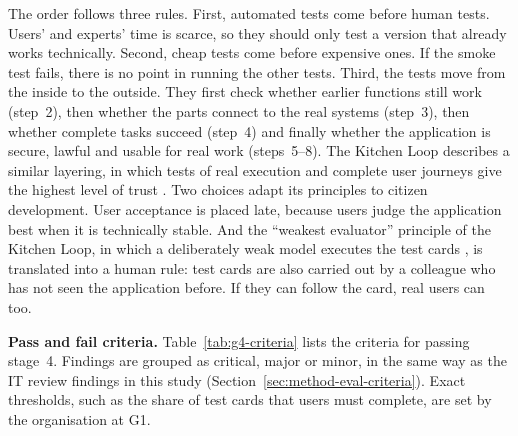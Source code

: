\documentclass[10pt,a4paper]{article}
\begin{document}
The order follows three rules. First, automated tests come before human tests.
Users' and experts' time is scarce, so they should only test a version that
already works technically. Second, cheap tests come before expensive ones. If
the smoke test fails, there is no point in running the other tests. Third, the
tests move from the inside to the outside. They first check whether earlier
functions still work (step~2), then whether the parts connect to the real
systems (step~3), then whether complete tasks succeed (step~4) and finally
whether the application is secure, lawful and usable for real work
(steps~5--8). The Kitchen Loop describes a similar layering, in which tests of
real execution and complete user journeys give the highest level of trust
\parencite{TODO-kitchenloop}. Two choices adapt its principles to citizen
development. User acceptance is placed late, because users judge the
application best when it is technically stable. And the \enquote{weakest
evaluator} principle of the Kitchen Loop, in which a deliberately weak model
executes the test cards \parencite{TODO-kitchenloop}, is translated into a
human rule: test cards are also carried out by a colleague who has not seen
the application before. If they can follow the card, real users can too.

\textbf{Pass and fail criteria.} Table~\ref{tab:g4-criteria} lists the
criteria for passing stage~4. Findings are grouped as critical, major or minor,
in the same way as the IT review findings in this study
(Section~\ref{sec:method-eval-criteria}). Exact thresholds, such as the share
of test cards that users must complete, are set by the organisation at G1.
\end{document}
